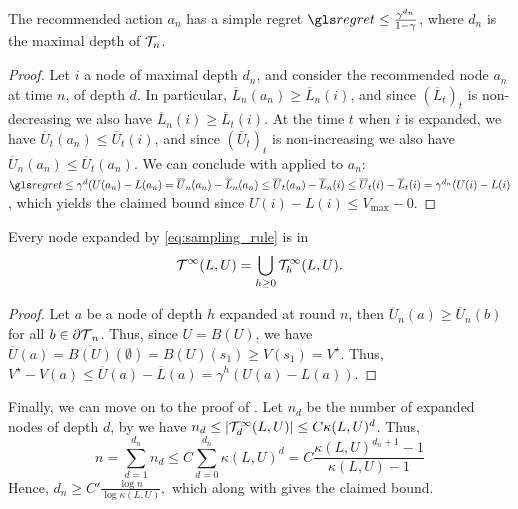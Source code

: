 \begin{lemma}[Recommendation]
\begin{leftbar}[lemmabar]
\label{lem:recommendation-bound-U}
The recommended action $a_n$ has a simple regret $\regret \leq \frac{\gamma^{d_n}}{1-\gamma}$, where $d_n$ is the maximal depth of $\mathcal{T}_n$.
\end{leftbar}
\end{lemma}
\begin{proof}
Let $i$ a node of maximal depth $d_n$, and consider the recommended node $a_n$ at time $n$, of depth $d$. In particular, $\overline{L}_n(a_n) \geq \overline{L}_n(i)$, and since $(\overline{L}_t)_t$ is non-decreasing we also have $\overline{L}_n(i) \geq \overline{L}_t(i)$. At the time $t$ when $i$ is expanded, we have $\overline{U}_t(a_n) \leq \overline{U}_t(i)$, and since $(\overline{U}_t)_t$ is non-increasing we also have $\overline{U}_n(a_n) \leq \overline{U}_t(a_n)$. We can conclude with  applied to $a_n$: $\regret \leq \gamma^d(U(a_n)-L(a_n) = \overline{U}_n(a_n) - \overline{L}_n(a_n)  \leq \overline{U}_t(a_n) - \overline{L}_n(i) \leq \overline{U}_t(i) - \overline{L}_t(i) = \gamma^{d_n}(U(i) - L(i)$, which yields the claimed bound since $U(i) - L(i) \leq V_{\max}-0$.
\end{proof}

\begin{lemma}
\begin{leftbar}[lemmabar]
\label{lem:near-optimal-nodes-U}
Every node expanded by \eqref{eq:sampling_rule} is in $$\mathcal{T}^\infty(L,U) = \bigcup_{h\geq 0} \mathcal{T}^\infty_h(L,U).$$
\end{leftbar}
\end{lemma}
\begin{proof}
Let $a$ be a node of depth $h$ expanded at round $n$, then $\overline{U}_n(a) \geq \overline{U}_n(b)$ for all $b\in{\partial \mathcal{T}}_n$. Thus, since $U = B(U)$, we have $\overline{U}(a) = \overline{B(U)}(\emptyset) = B(U)(s_1) \geq V(s_1) = V^\star$. Thus, $V^\star - V(a) \leq \overline{U}(a) - \overline{L}(a) = \gamma^h(U(a) - L(a))$.
\end{proof}

Finally, we can move on to the proof of .
Let $n_d$ be the number of expanded nodes of depth $d$, by  we have $n_d \leq |\mathcal{T}^\infty_d(L,U)| \leq C\kappa(L,U)^d$. Thus, 
\[n = \sum_{d=1}^{d_n} n_d \leq C\sum_{d=0}^{d_n} \kappa(L,U)^d = C\frac{\kappa(L,U)^{d_n+1}-1}{\kappa(L,U)-1}\]
Hence, $d_n \geq C'\frac{\log n}{\log\kappa(L,U)},$ which along with  gives the claimed bound.

